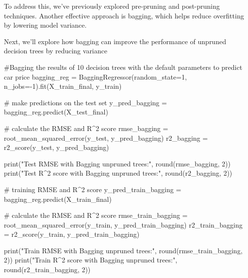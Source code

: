 \documentclass[
  letterpaper,
  DIV=11,
  numbers=noendperiod]{scrreprt}
\newenvironment{Shaded}{\begin{snugshade}}{\end{snugshade}}
\newcommand{\BuiltInTok}[1]{\textcolor[rgb]{0.00,0.23,0.31}{#1}}
\newcommand{\CommentTok}[1]{\textcolor[rgb]{0.37,0.37,0.37}{#1}}
\newcommand{\DecValTok}[1]{\textcolor[rgb]{0.68,0.00,0.00}{#1}}
\newcommand{\NormalTok}[1]{\textcolor[rgb]{0.00,0.23,0.31}{#1}}
\newcommand{\OperatorTok}[1]{\textcolor[rgb]{0.37,0.37,0.37}{#1}}
\newcommand{\StringTok}[1]{\textcolor[rgb]{0.13,0.47,0.30}{#1}}
\begin{document}
To address this, we've previously explored pre-pruning and post-pruning
techniques. Another effective approach is bagging, which helps reduce
overfitting by lowering model variance.

Next, we'll explore how bagging can improve the performance of unpruned
decision trees by reducing variance

\begin{Shaded}
\begin{Highlighting}[]
\CommentTok{\#Bagging the results of 10 decision trees with the default parameters to predict car price}
\NormalTok{bagging\_reg }\OperatorTok{=}\NormalTok{ BaggingRegressor(random\_state}\OperatorTok{=}\DecValTok{1}\NormalTok{, }
\NormalTok{                        n\_jobs}\OperatorTok{={-}}\DecValTok{1}\NormalTok{).fit(X\_train\_final, y\_train)}

\CommentTok{\# make predictions on the test set}
\NormalTok{y\_pred\_bagging }\OperatorTok{=}\NormalTok{ bagging\_reg.predict(X\_test\_final)}

\CommentTok{\# calculate the RMSE and R\^{}2 score}
\NormalTok{rmse\_bagging }\OperatorTok{=}\NormalTok{ root\_mean\_squared\_error(y\_test, y\_pred\_bagging)}
\NormalTok{r2\_bagging }\OperatorTok{=}\NormalTok{ r2\_score(y\_test, y\_pred\_bagging)}

\BuiltInTok{print}\NormalTok{(}\StringTok{"Test RMSE with Bagging unpruned trees:"}\NormalTok{, }\BuiltInTok{round}\NormalTok{(rmse\_bagging, }\DecValTok{2}\NormalTok{))}
\BuiltInTok{print}\NormalTok{(}\StringTok{"Test R\^{}2 score with Bagging unpruned trees:"}\NormalTok{, }\BuiltInTok{round}\NormalTok{(r2\_bagging, }\DecValTok{2}\NormalTok{))}

\CommentTok{\# training RMSE and R\^{}2 score}
\NormalTok{y\_pred\_train\_bagging }\OperatorTok{=}\NormalTok{ bagging\_reg.predict(X\_train\_final)}

\CommentTok{\# calculate the RMSE and R\^{}2 score}
\NormalTok{rmse\_train\_bagging }\OperatorTok{=}\NormalTok{ root\_mean\_squared\_error(y\_train, y\_pred\_train\_bagging)}
\NormalTok{r2\_train\_bagging }\OperatorTok{=}\NormalTok{ r2\_score(y\_train, y\_pred\_train\_bagging)}

\BuiltInTok{print}\NormalTok{(}\StringTok{"Train RMSE with Bagging unpruned trees:"}\NormalTok{, }\BuiltInTok{round}\NormalTok{(rmse\_train\_bagging, }\DecValTok{2}\NormalTok{))}
\BuiltInTok{print}\NormalTok{(}\StringTok{"Train R\^{}2 score with Bagging unpruned trees:"}\NormalTok{, }\BuiltInTok{round}\NormalTok{(r2\_train\_bagging, }\DecValTok{2}\NormalTok{))}
\end{Highlighting}
\end{Shaded}
\end{document}
